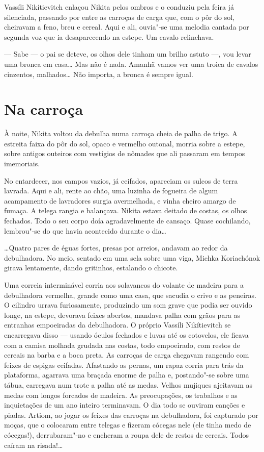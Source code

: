 Vassíli Nikítievitch enlaçou Nikita pelos ombros e o conduziu pela feira
já silenciada, passando por entre as carroças de carga que, com o pôr do
sol, cheiravam a feno, breu e cereal. Aqui e ali, ouvia"-se uma melodia
cantada por segunda voz que ia desaparecendo na estepe. Um cavalo
relinchava.

--- Sabe --- o pai se deteve, os olhos dele tinham um brilho astuto ---,
vou levar uma bronca em casa\ldots{} Mas não é nada. Amanhã vamos ver uma
troica de cavalos cinzentos, malhados\ldots{} Não importa, a bronca é sempre
igual.

\chapter{Na carroça}

À noite, Nikita voltou da debulha numa carroça cheia de palha de trigo.
A estreita faixa do pôr do sol, opaco e vermelho outonal, morria sobre a
estepe, sobre antigos outeiros com vestígios de nômades que ali passaram
em tempos imemoriais.

No entardecer, nos campos vazios, já ceifados, apareciam os sulcos de
terra lavrada. Aqui e ali, rente ao chão, uma luzinha de fogueira de
algum acampamento de lavradores surgia avermelhada, e vinha cheiro
amargo de fumaça. A telega rangia e balançava. Nikita estava deitado de
costas, os olhos fechados. Todo o seu corpo doía agradavelmente de
cansaço. Quase cochilando, lembrou"-se do que havia acontecido durante o
dia\ldots{}

\ldots{}Quatro pares de éguas fortes, presas
por arreios, andavam ao redor da debulhadora. No meio, sentado em uma sela sobre uma viga, Michka
Koriachónok girava lentamente, dando gritinhos, estalando o chicote.

Uma correia interminável corria aos solavancos do volante de madeira
para a debulhadora vermelha, grande como uma casa, que sacudia o crivo e
as peneiras. O cilindro urrava furiosamente, produzindo um som grave que
podia ser ouvido longe, na estepe, devorava feixes abertos, mandava
palha com grãos para as entranhas empoeiradas da debulhadora. O próprio
Vassíli Nikítievitch se encarregava disso --- usando óculos fechados e
luvas até os cotovelos, ele ficava com a camisa molhada grudada nas costas,
todo empoeirado, com restos de cereais na barba e a boca preta. As
carroças de carga chegavam rangendo com feixes de espigas ceifadas.
Afastando as pernas, um rapaz corria para trás da plataforma, agarrava
uma braçada enorme de palha e, postando"-se sobre uma tábua, carregava
num trote a palha até as medas. Velhos mujiques ajeitavam as medas com
longos forcados de madeira. As preocupações, os trabalhos e as
inquietações de um ano inteiro terminavam. O dia todo se ouviram canções
e piadas. Artiom, ao jogar os feixes das carroças na debulhadora, foi
capturado por moças, que o colocaram entre telegas e fizeram cócegas
nele (ele tinha medo de cócegas!), derrubaram"-no e encheram a roupa dele
de restos de cereais. Todos caíram na risada!\ldots{}

